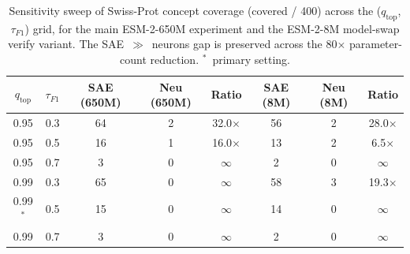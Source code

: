 \begin{table}[t]
\centering
\caption{Sensitivity sweep of Swiss-Prot concept coverage (covered / 400) across the ($q_{\text{top}}$, $\tau_{F1}$) grid, for the main ESM-2-650M experiment and the ESM-2-8M model-swap verify variant. The SAE~$\gg$~neurons gap is preserved across the 80$\times$ parameter-count reduction. $^{\ast}$~primary setting.}
\label{tab:c2_sensitivity}
\begin{tabular}{cc | ccc | ccc}
\toprule
$q_{\text{top}}$ & $\tau_{F1}$ & SAE (650M) & Neu (650M) & Ratio & SAE (8M) & Neu (8M) & Ratio \\
\midrule
    0.95 & 0.3 & 64 & 2 & 32.0$\times$ & 56 & 2 & 28.0$\times$ \\
    0.95 & 0.5 & 16 & 1 & 16.0$\times$ & 13 & 2 & 6.5$\times$ \\
    0.95 & 0.7 & 3 & 0 & $\infty$ & 2 & 0 & $\infty$ \\
    0.99 & 0.3 & 65 & 0 & $\infty$ & 58 & 3 & 19.3$\times$ \\
    0.99$^{\ast}$ & 0.5 & 15 & 0 & $\infty$ & 14 & 0 & $\infty$ \\
    0.99 & 0.7 & 3 & 0 & $\infty$ & 2 & 0 & $\infty$ \\

\bottomrule
\end{tabular}
\end{table}
